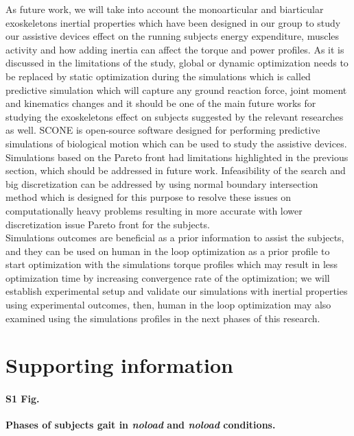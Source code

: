 \documentclass[10pt,letterpaper]{article}
\begin{document}
As future work, we will take into account the monoarticular and biarticular exoskeletons inertial properties which have been designed in our group to study our assistive devices effect on the running subjects energy expenditure, muscles activity and how adding inertia can affect the torque and power profiles. As it is discussed in the limitations of the study, global or dynamic optimization needs to be replaced by static optimization during the simulations which is called predictive simulation \cite{111,112} which will capture any ground reaction force, joint moment and kinematics changes and it should be one of the main future works for studying the exoskeletons effect on subjects suggested by the relevant researches \cite{2,93} as well. SCONE \cite{110} is open-source software designed for performing predictive simulations of biological motion which can be used to study the assistive devices.\\
Simulations based on the Pareto front had limitations highlighted in the previous section, which should be addressed in future work. Infeasibility of the search and big discretization can be addressed by using normal boundary intersection method \cite{108} which is designed for this purpose to resolve these issues on computationally heavy problems resulting in more accurate with lower discretization issue Pareto front for the subjects.\\
Simulations outcomes are beneficial as a prior information to assist the subjects, and they can be used on human in the loop optimization \cite{109} as a prior profile to start optimization with the simulations  torque profiles which may result in less optimization time by increasing convergence rate of the optimization; we will establish experimental setup and validate our simulations with inertial properties using experimental outcomes, then, human in the loop optimization may also examined using the simulations profiles in the next phases of this research.\\
\section*{Supporting information}

\paragraph*{S1 Fig.}
\label{S1_Fig}
{\bf Phases of subjects gait in \textit{noload} and \textit{noload} conditions.}
\end{document}
